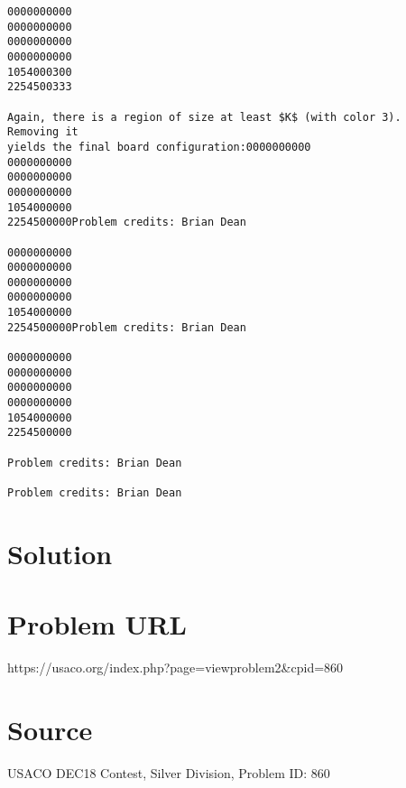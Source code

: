 \documentclass[12pt]{article}
\begin{document}
\begin{verbatim}
0000000000
0000000000
0000000000
0000000000
1054000300
2254500333

Again, there is a region of size at least $K$ (with color 3).  Removing it
yields the final board configuration:0000000000
0000000000
0000000000
0000000000
1054000000
2254500000Problem credits: Brian Dean

0000000000
0000000000
0000000000
0000000000
1054000000
2254500000Problem credits: Brian Dean

0000000000
0000000000
0000000000
0000000000
1054000000
2254500000

Problem credits: Brian Dean

Problem credits: Brian Dean
\end{verbatim}

\section*{Solution}


\section*{Problem URL}
https://usaco.org/index.php?page=viewproblem2&cpid=860

\section*{Source}
USACO DEC18 Contest, Silver Division, Problem ID: 860
\end{document}
